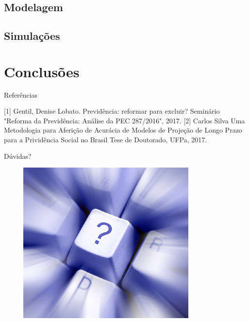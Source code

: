 \documentclass{beamer}
\begin{document}
\subsection{Modelagem}
\frame{\tableofcontents[currentsection]}


\subsection{Simulações}
\frame{\tableofcontents[currentsection]}


\section{Conclusões}
\frame{\tableofcontents[currentsection]}



\begin{frame}[allowframebreaks]{Referências}
% 

\begin{thebibliography}{10}
		[1]
      Gentil, Denise Lobato.
      \newblock Previdência: reformar para excluir?
      \newblock Seminário "Reforma da Previdência: Análise da PEC 287/2016",
      2017.
		[2]
			Carlos Silva
			\newblock Uma Metodologia para Aferição de Acurácia de Modelos de
      Projeção de Longo Prazo para a Prividência Social no Brasil
			\newblock Tese de Doutorado, UFPa, 2017.
\end{thebibliography}
\end{frame}

\begin{frame}{Dúvidas?}
  \begin{figure}[h]
  	\begin{center}
      \includegraphics [scale=0.4]{./Figures/duvida}
  	\end{center}
  \end{figure}
\end{frame}
\end{document}
